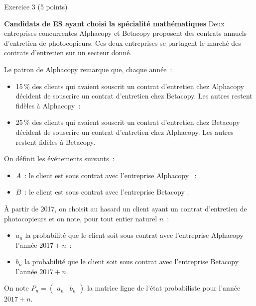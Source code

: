 
%
\begin{h2}Exercice 3 (5 points)\end{h2}
\textbf{Candidats de ES ayant choisi la spécialité \og mathématiques \fg{}}
\medskip
Deux entreprises concurrentes \og Alphacopy \fg{} et \og Betacopy \fg{} proposent des contrats annuels d'entretien de photocopieurs. Ces deux entreprises se partagent le marché des contrats d'entretien sur un secteur donné.
\par
\smallskip
\par
Le patron de Alphacopy remarque que, chaque année~:
\begin{itemize}
     \item 15\,\% des clients qui avaient souscrit un contrat d'entretien chez Alphacopy décident de souscrire un contrat d'entretien chez Betacopy. Les autres restent fidèles à Alphacopy~:
     \item 25\,\% des clients qui avaient souscrit un contrat d'entretien chez Betacopy décident de souscrire un contrat d'entretien chez Alphacopy. Les autres restent fidèles à Betacopy.
\end{itemize}
\smallskip
\par
On définit les événements suivants~:
\begin{itemize}
     \item $A$~: \og le client est sous contrat avec  l'entreprise Alphacopy \fg{}~:
     \item $B$~: \og le client est sous contrat avec l'entreprise Betacopy \fg{}.
\end{itemize}
\smallskip
\par
À partir de 2017, on choisit au hasard un client ayant un contrat d'entretien de photocopieurs et on note, pour tout entier naturel $n$~:
\par
\smallskip
\par
\begin{itemize}
     \item $a_n$ la probabilité que le client soit sous contrat avec l'entreprise Alphacopy l'année $2017+n$~:
     \item $b_n$ la probabilité que le client soit sous contrat avec l'entreprise Betacopy l'année $2017+ n$.
\end{itemize}
On note $P_n=\begin{pmatrix} a_n & b_n\end{pmatrix}$ la matrice ligne de l'état probabiliste pour l'année $2017+n$.
